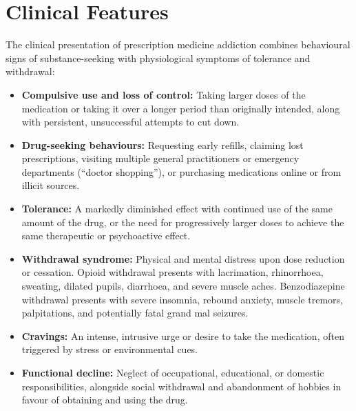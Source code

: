 \section*{Clinical Features}
The clinical presentation of prescription medicine addiction combines behavioural signs of substance-seeking with physiological symptoms of tolerance and withdrawal:
\begin{itemize}
    \item \textbf{Compulsive use and loss of control:} Taking larger doses of the medication or taking it over a longer period than originally intended, along with persistent, unsuccessful attempts to cut down.
    \item \textbf{Drug-seeking behaviours:} Requesting early refills, claiming lost prescriptions, visiting multiple general practitioners or emergency departments (``doctor shopping''), or purchasing medications online or from illicit sources.
    \item \textbf{Tolerance:} A markedly diminished effect with continued use of the same amount of the drug, or the need for progressively larger doses to achieve the same therapeutic or psychoactive effect.
    \item \textbf{Withdrawal syndrome:} Physical and mental distress upon dose reduction or cessation. Opioid withdrawal presents with lacrimation, rhinorrhoea, sweating, dilated pupils, diarrhoea, and severe muscle aches. Benzodiazepine withdrawal presents with severe insomnia, rebound anxiety, muscle tremors, palpitations, and potentially fatal grand mal seizures.
    \item \textbf{Cravings:} An intense, intrusive urge or desire to take the medication, often triggered by stress or environmental cues.
    \item \textbf{Functional decline:} Neglect of occupational, educational, or domestic responsibilities, alongside social withdrawal and abandonment of hobbies in favour of obtaining and using the drug.
\end{itemize}

